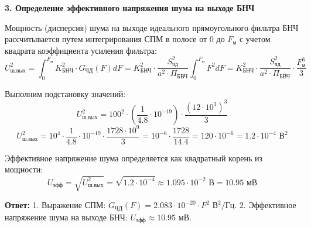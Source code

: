 \vspace{1em}
\textbf{3. Определение эффективного напряжения шума на выходе БНЧ}

Мощность (дисперсия) шума на выходе идеального прямоугольного фильтра БНЧ рассчитывается путем интегрирования СПМ в полосе от $0$ до $F_{\text{м}}$ с учетом квадрата коэффициента усиления фильтра:
\begin{equation*}
    U_{\text{ш.вых}}^2 = \int_0^{F_{\text{м}}} K_{\text{БНЧ}}^2 \cdot G_{\text{ЧД}}(F) dF = K_{\text{БНЧ}}^2 \cdot \frac{S_{\text{чд}}^2}{a^2 \cdot \Pi_{\text{БВЧ}}} \int_0^{F_{\text{м}}} F^2 dF = K_{\text{БНЧ}}^2 \cdot \frac{S_{\text{чд}}^2}{a^2 \cdot \Pi_{\text{БВЧ}}} \cdot \frac{F_{\text{м}}^3}{3}
\end{equation*}

Выполним подстановку значений:
\begin{equation*}
    U_{\text{ш.вых}}^2 = 100^2 \cdot \left( \frac{1}{4.8} \cdot 10^{-19} \right) \cdot \frac{(12 \cdot 10^3)^3}{3}
\end{equation*}
\begin{equation*}
    U_{\text{ш.вых}}^2 = 10^4 \cdot \frac{1}{4.8} \cdot 10^{-19} \cdot \frac{1728 \cdot 10^9}{3} = 10^{-6} \cdot \frac{1728}{14.4} = 120 \cdot 10^{-6} = 1.2 \cdot 10^{-4} \text{ В}^2
\end{equation*}

Эффективное напряжение шума определяется как квадратный корень из мощности:
\begin{equation*}
    U_{\text{эфф}} = \sqrt{U_{\text{ш.вых}}^2} = \sqrt{1.2 \cdot 10^{-4}} \approx 1.095 \cdot 10^{-2} \text{ В} = 10.95 \text{ мВ}
\end{equation*}

\textbf{Ответ:}
1. Выражение СПМ: $G_{\text{ЧД}}(F) = 2.083 \cdot 10^{-20} \cdot F^2 \text{ В}^2/\text{Гц}$.
2. Эффективное напряжение шума на выходе БНЧ: $U_{\text{эфф}} \approx 10.95 \text{ мВ}$.